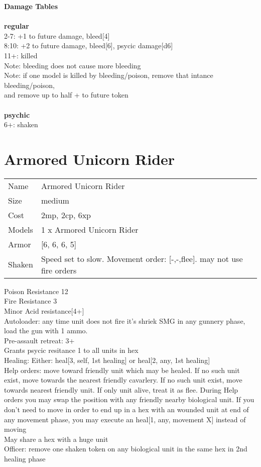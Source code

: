 {\bf Damage Tables} \\
\ \\ {\bf regular } \\
2-7: +1 to future damage, bleed[4] \\
8:10: +2 to future damage, bleed[6], psycic damage[d6] \\
11+: killed \\
Note: bleeding does not cause more bleeding \\
Note: if one model is killed by bleeding/poison, remove that intance bleeding/poison, \\ and remove up to half + to future token \\
\ \\ {\bf psychic } \\
6+: shaken \\










\pagebreak\pagebreak

\section{ Armored Unicorn Rider }

\begin{tabular}{ll}
  Name & Armored Unicorn Rider \\
  Size & medium\\
  Cost & 2mp, 2cp, 6xp\\
  Models & 1 x Armored Unicorn Rider\\
  Armor & [6, 6, 6, 5]\\
  Shaken & Speed set to slow. Movement order: [-,-,flee]. may not use fire orders\\
\end{tabular}

\noindent Poison Resistance 12\\ 
Fire Resistance 3\\ 
Minor Acid resistance[4+]\\ 
Autoloader: any time unit does not fire it's shriek SMG in any gunnery phase, load the gun with 1 ammo.\\ 
Pre-assault retreat: 3+\\ 
Grants psycic resitance 1 to all units in hex\\ 
Healing: Either: heal[3, self, 1st healing] or heal[2, any, 1st healing]\\ 
Help orders: move toward friendly unit which may be healed. If no such unit exist, move towards the nearest friendly cavarlery. If no such unit exist, move towards nearest friendly unit. If only unit alive, treat it as flee. During Help orders you may swap the position with any friendly nearby biological unit. If you don't need to move in order to end up in a hex with an wounded unit at end of any movement phase, you may execute an heal[1, any, movement X] instead of moving\\ 
May share a hex with a huge unit\\ 
Officer: remove one shaken token on any biological unit in the same hex in 2nd healing  phase\\ 


